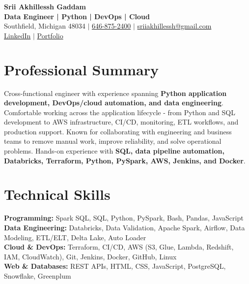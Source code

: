 \documentclass[letterpaper,10pt]{article}
\begin{document}
\fontsize{9.35pt}{10.45pt}\selectfont

\begin{center}
    {\LARGE \textbf{Srii Akhillessh Gaddam}} \\[-1pt]
    \textbf{Data Engineer | Python | DevOps | Cloud} \\[2pt]
    Southfield, Michigan 48034 $|$
    \href{tel:6468752400}{646-875-2400} $|$
    \href{mailto:sriiakhillessh@gmail.com}{sriiakhillessh@gmail.com} \\[1pt]
    \href{https://www.linkedin.com/in/srii-akhiilessh-gaddam-b48668191/}{LinkedIn} $|$
    \href{https://sriiakhillesshg.github.io/portfolio/}{Portfolio}
\end{center}
\vspace{-8pt}

\section{Professional Summary}
\small{Cross-functional engineer with experience spanning \textbf{Python application development, DevOps/cloud automation, and data engineering}. Comfortable working across the application lifecycle - from Python and SQL development to AWS infrastructure, CI/CD, monitoring, ETL workflows, and production support. Known for collaborating with engineering and business teams to remove manual work, improve reliability, and solve operational problems. Hands-on experience with \textbf{SQL, data pipeline automation, Databricks, Terraform, Python, PySpark, AWS, Jenkins, and Docker}.}

\section{Technical Skills}
\small{
\textbf{Programming:} Spark SQL, SQL, Python, PySpark, Bash, Pandas, JavaScript \\
\textbf{Data Engineering:} Databricks, Data Validation, Apache Spark, Airflow, Data Modeling, ETL/ELT, Delta Lake, Auto Loader \\
\textbf{Cloud \& DevOps:} Terraform, CI/CD, AWS (S3, Glue, Lambda, Redshift, IAM, CloudWatch), Git, Jenkins, Docker, GitHub, Linux \\
\textbf{Web \& Databases:} REST APIs, HTML, CSS, JavaScript, PostgreSQL, Snowflake, Greenplum
}

\end{document}
